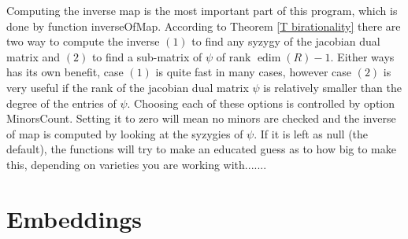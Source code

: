 \documentclass[12pt]{amsart}
\numberwithin{equation}{theorem}
\renewcommand{\:}{\colon}
\DeclareMathOperator{\edim}{edim}
\theoremstyle{theorem}
\begin{document}
Computing the inverse map is the most important part of this program, which is done by function {\sc inverseOfMap}. According to Theorem \ref{T birationality} there are two way to compute the inverse $(1)$ to find any syzygy of the jacobian dual matrix and $(2)$ to find a sub-matrix of $\psi$ of rank $\edim(R)-1$. Either ways has its own benefit, case $(1)$ is quite fast in many cases, however case $(2)$ is very useful if the rank of the jacobian dual matrix  $\psi$ is relatively smaller than the degree of the entries of $\psi$. Choosing each of these options is controlled by option {\sc MinorsCount}. Setting it to zero will mean no minors are checked and the inverse of map is computed by looking at the syzygies of $\psi$.  If it is left as null (the default), the functions will try to make an educated guess as to how big to make this, depending on varieties you are working with.......

\section{Embeddings}



\end{document}
